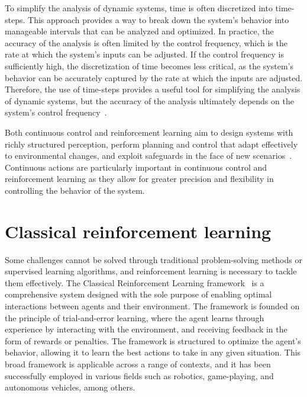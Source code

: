 To simplify the analysis of dynamic systems, time is often discretized into time-steps. This approach provides a way to break down the system's behavior into manageable intervals that can be analyzed and optimized. In practice, the accuracy of the analysis is often limited by the control frequency, which is the rate at which the system's inputs can be adjusted. If the control frequency is sufficiently high, the discretization of time becomes less critical, as the system's behavior can be accurately captured by the rate at which the inputs are adjusted. Therefore, the use of time-steps provides a useful tool for simplifying the analysis of dynamic systems, but the accuracy of the analysis ultimately depends on the system's control frequency~\cite{franklin_feedback_2014}.

Both continuous control and reinforcement learning aim to design systems with richly structured perception, perform planning and control that adapt effectively to environmental changes, and exploit safeguards in the face of new scenarios~\cite{recht_tour_2019}. Continuous actions are particularly important in continuous control and reinforcement learning as they allow for greater precision and flexibility in controlling the behavior of the system.

\section{Classical reinforcement learning}

Some challenges cannot be solved through traditional problem-solving methods or supervised learning algorithms, and reinforcement learning is necessary to tackle them effectively. 
The Classical Reinforcement Learning framework~\cite{sutton_reinforcement_1998} is a comprehensive system designed with the sole purpose of enabling optimal interactions between agents and their environment. The framework is founded on the principle of trial-and-error learning, where the agent learns through experience by interacting with the environment, and receiving feedback in the form of rewards or penalties. The framework is structured to optimize the agent's behavior, allowing it to learn the best actions to take in any given situation. This broad framework is applicable across a range of contexts, and it has been successfully employed in various fields such as robotics, game-playing, and autonomous vehicles, among others.

